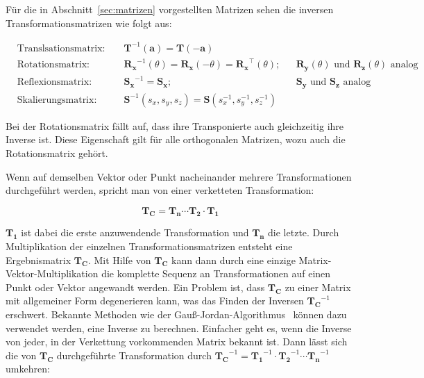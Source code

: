 Für die in Abschnitt~\ref{sec:matrizen} vorgestellten Matrizen sehen die inversen Transformationsmatrizen wie folgt aus:

\begin{align*}
    &\text{Translsationsmatrix: } &  &\boldsymbol{T}^{-1}(\boldsymbol{a}) = \boldsymbol{T}(-\boldsymbol{a})\\
    &\text{Rotationsmatrix: }    &  &\boldsymbol{R_x}^{-1}(\theta) = \boldsymbol{R_x}(-\theta) = \boldsymbol{R_x}^{\intercal}(\theta); &  &\boldsymbol{R_y}(\theta) \text{ und }  \boldsymbol{R_z}(\theta) \text{ analog}\\
    &\text{Reflexionsmatrix: }   &  &\boldsymbol{S_x}^{-1} = \boldsymbol{S_x}; &  &\boldsymbol{S_y} \text{ und } \boldsymbol{S_z} \text{ analog}\\
    &\text{Skalierungsmatrix: }  &  &\boldsymbol{S}^{-1}(s_x, s_y, s_z) = \boldsymbol{S}(s_x^{-1}, s_y^{-1}, s_z^{-1})
\end{align*}

Bei der Rotationsmatrix fällt auf, dass ihre Transponierte auch gleichzeitig ihre Inverse ist. Diese Eigenschaft gilt für alle orthogonalen Matrizen, wozu auch die Rotationsmatrix gehört.

Wenn auf demselben Vektor oder Punkt nacheinander mehrere Transformationen durchgeführt werden, spricht man von einer verketteten Transformation: 

\begin{equation*}
\boldsymbol{T_C} = \boldsymbol{T_n} \cdots \boldsymbol{T_2} \cdot \boldsymbol{T_1}
\end{equation*}


\( \boldsymbol{T_1} \) ist dabei die erste anzuwendende Transformation und  \( \boldsymbol{T_n} \) die letzte. Durch Multiplikation der einzelnen Transformationsmatrizen
entsteht eine Ergebnismatrix \( \boldsymbol{T_C} \). Mit Hilfe von \( \boldsymbol{T_C} \) kann dann durch eine einzige Matrix-Vektor-Multiplikation die komplette Sequenz an Transformationen auf einen Punkt oder Vektor angewandt werden. 
Ein Problem ist, dass \( \boldsymbol{T_C} \) zu einer Matrix mit allgemeiner Form degenerieren kann, was das Finden der Inversen \( \boldsymbol{T_C}^{-1} \) erschwert. Bekannte Methoden wie der Gauß-Jordan-Algorithmus~\cite{aransay2014AppGaualgdonrig} können dazu verwendet werden, eine Inverse zu berechnen. Einfacher geht es, wenn die Inverse von jeder, in der Verkettung vorkommenden Matrix bekannt ist. Dann lässt sich die von \( \boldsymbol{T_C} \) durchgeführte Transformation durch \( \boldsymbol{T_C}^{-1} = \boldsymbol{T_1}^{-1} \cdot \boldsymbol{T_2}^{-1} \cdots \boldsymbol{T_n}^{-1} \) umkehren:

